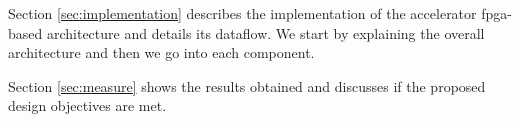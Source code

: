 Section \ref{sec:implementation} describes the implementation of the accelerator \acrshort{fpga}-based architecture and details its dataflow. We start by explaining the overall architecture and then we go into each component.

Section \ref{sec:measure} shows the results obtained and discusses if the proposed design objectives are met.
%

%
%

%
%

%
%
\afterpage{\blankpage}
\cleardoublepage
\newpage
